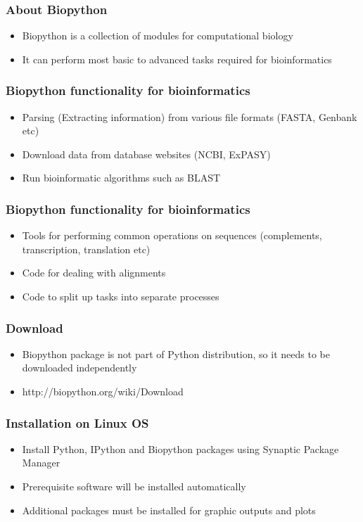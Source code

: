 \documentclass[17pt]{beamer}
\begin{document}
\begin{frame}
\frametitle{About Biopython} \pause
\begin{itemize}[<+-|alert@+>]
\item Biopython is a collection of modules for computational biology
\item It can perform most basic to advanced tasks required for bioinformatics
\end{itemize}
\end{frame}

\begin{frame}
\frametitle{Biopython functionality for bioinformatics} \pause
\begin{itemize}[<+-|alert@+>]
\item Parsing (Extracting information) from various file formats ({\color {blue}FASTA, Genbank} etc)
\item Download data from  database websites ({\color {blue}NCBI, ExPASY}) 
\item Run bioinformatic algorithms such as BLAST
\end{itemize}
\end{frame}

\begin{frame}
\frametitle {Biopython functionality for bioinformatics } \pause
\begin{itemize}[<+-|alert@+>]
\item Tools for performing common operations on sequences (complements, transcription, translation etc)
\item Code for dealing with alignments
\item Code to split up tasks into separate processes 
\end{itemize}
\end{frame}

\begin{frame}
\frametitle{Download}\pause
\begin{itemize}[<+-|alert@+>]
\item Biopython package is not part of Python distribution, so it  needs to be downloaded independently
\item {\color {blue} http://biopython.org/wiki/Download} 
\end{itemize}
\end{frame}

\begin{frame}
\frametitle{Installation on Linux OS}\pause
\begin{itemize}[<+-|alert@+>]
\item Install Python, IPython and Biopython packages using Synaptic Package Manager
\item Prerequisite software will be installed automatically
\item Additional packages must be installed for graphic outputs and plots
\end{itemize}
\end{frame}
\end{document}
